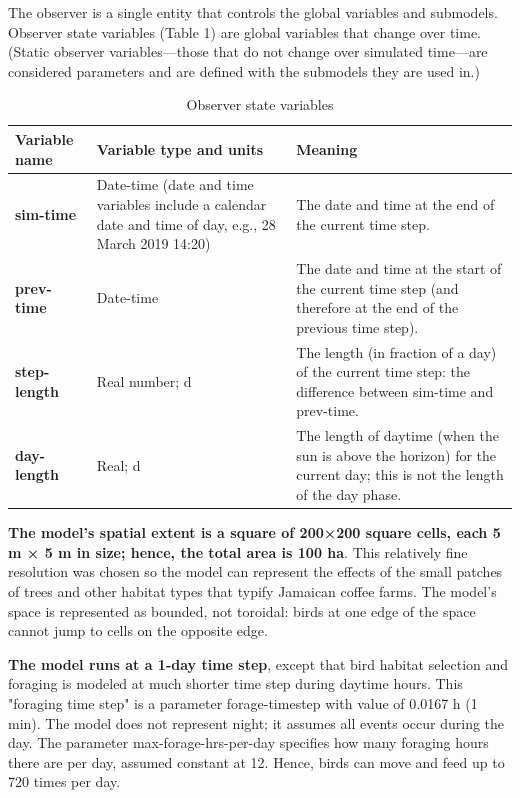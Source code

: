 
{
  \color{gddarkcornflowerblueb}
  The observer is a single entity that controls the global variables and submodels. Observer state variables (Table 1) are global variables that change over time. (Static observer variables—those that do not change over simulated time—are considered parameters and are defined with the submodels they are used in.)

  \smallskip

  \begin{table}[h]
    \footnotesize
    \color{gddarkcornflowerblueb}
    \centering
    \linespread{1.5}\selectfont
    \caption{Observer state variables}
    \begin{tabular}{ p{2.5cm} p{4cm} p{8cm} }
        \hline
        Variable name & Variable type and units & Meaning \\
        \hline
        \textbf{sim-time} &
        Date-time (date and time variables include a calendar date and time of day, e.g., 28 March 2019 14:20) &
        The date and time at the end of the current time step. \\
        \hline
        \textbf{prev-time} &
        Date-time &
        The date and time at the start of the current time step (and therefore at the end of the previous time step). \\
        \hline
        \textbf{step-length} &
        Real number; d &
        The length (in fraction of a day) of the current time step: the difference between sim-time and prev-time. \\
        \hline
        \textbf{day-length} &
        Real; d &
        The length of daytime (when the sun is above the horizon) for the current day; this is not the length of the day phase. \\
        \hline
    \end{tabular}
  \end{table}
}


{
  \color{gddarkpurpleb}
  \textbf{The model's spatial extent is a square of 200×200 square cells, each 5 m × 5 m in size; hence, the total area is 100 ha}. This relatively fine resolution was chosen so the model can represent the effects of the small patches of trees and other habitat types that typify Jamaican coffee farms. The model's space is represented as bounded, not toroidal: birds at one edge of the space cannot jump to cells on the opposite edge.

  \textbf{The model runs at a 1-day time step}, except that bird habitat selection and foraging is modeled at much shorter time step during daytime hours. This "foraging time step" is a parameter forage-timestep with value of 0.0167 h (1 min). The model does not represent night; it assumes all events occur during the day. The parameter max-forage-hrs-per-day specifies how many foraging hours there are per day, assumed constant at 12. Hence, birds can move and feed up to 720 times per day.
}


